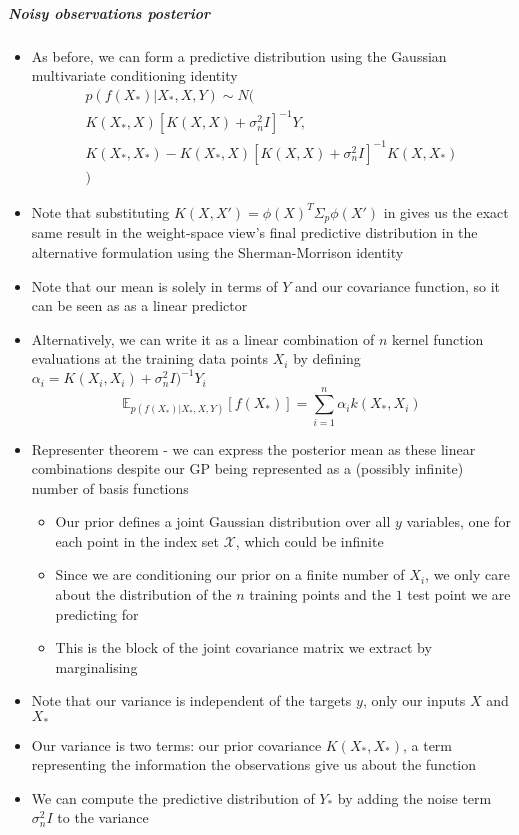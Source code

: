 \documentclass[12pt]{article}
\begin{document}
\subparagraph{Noisy observations posterior}
\begin{itemize}
    \item As before, we can form a predictive distribution using the Gaussian multivariate conditioning identity
\begin{equation}
    \begin{aligned}
        p(f(X_*)|X_*, X, Y) \sim N( \\
        K(X_*,X)[K(X,X) + \sigma^2_nI]^{-1}Y, \\
        K(X_*,X_*) - K(X_*,X)[K(X,X) + \sigma^2_nI]^{-1}K(X,X_*) \\
        )
    \end{aligned}
\end{equation}
    \item Note that substituting $K(X,X') = \phi(X)^T\Sigma_p\phi(X')$ in gives us the exact same result in the weight-space view's final predictive distribution in the alternative formulation using the Sherman-Morrison identity
    \item Note that our mean is solely in terms of $Y$ and our covariance function, so it can be seen as as a linear predictor
    \item Alternatively, we can write it as a linear combination of $n$ kernel function evaluations at the training data points $X_i$ by defining $\alpha_i = K(X_i, X_i) + \sigma_n^2I)^{-1}Y_i$
\begin{equation}
    \mathbb{E}_{p(f(X_*)|X_*,X,Y)}[f(X_*)] = \sum_{i=1}^n \alpha_i k(X_*, X_i)
\end{equation}
    \item Representer theorem - we can express the posterior mean as these linear combinations despite our GP being represented as a (possibly infinite) number of basis functions
    \begin{itemize}
        \item Our prior defines a joint Gaussian distribution over all $y$ variables, one for each point in the index set $\mathcal{X}$, which could be infinite
        \item Since we are conditioning our prior on a finite number of $X_i$, we only care about the distribution of the $n$ training points and the $1$ test point we are predicting for
        \item This is the block of the joint covariance matrix we extract by marginalising
    \end{itemize}
    \item Note that our variance is independent of the targets $y$, only our inputs $X$ and $X_*$
    \item Our variance is two terms: our prior covariance $K(X_*,X_*)$, a term representing the information the observations give us about the function
    \item We can compute the predictive distribution of $Y_*$ by adding the noise term $\sigma^2_nI$ to the variance
\end{itemize}
\end{document}
